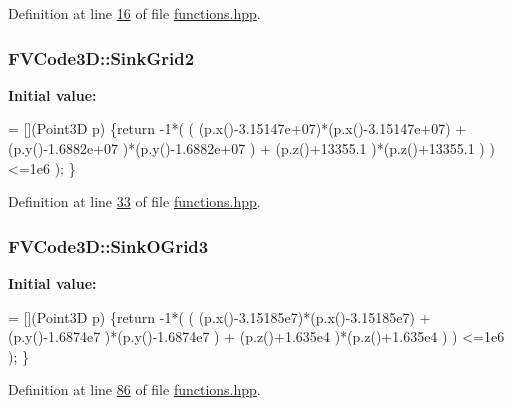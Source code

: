 Definition at line \hyperlink{functions_8hpp_source_l00016}{16} of file \hyperlink{functions_8hpp_source}{functions.\+hpp}.

\subsubsection[{\texorpdfstring{Sink\+Grid2}{SinkGrid2}}]{ F\+V\+Code3\+D\+::\+Sink\+Grid2}\hypertarget{namespaceFVCode3D_a312f262aefa197b219228571b49620be}{}\label{namespaceFVCode3D_a312f262aefa197b219228571b49620be}
{\bfseries Initial value\+:}
\begin{DoxyCode}
= [](Point3D p)
    \{\textcolor{keywordflow}{return} -1*( (
                     (p.x()-3.15147e+07)*(p.x()-3.15147e+07) +
                     (p.y()-1.6882e+07 )*(p.y()-1.6882e+07 ) +
                     (p.z()+13355.1    )*(p.z()+13355.1    )
                   ) <=1e6
                 );
    \}
\end{DoxyCode}


Definition at line \hyperlink{functions_8hpp_source_l00033}{33} of file \hyperlink{functions_8hpp_source}{functions.\+hpp}.

\subsubsection[{\texorpdfstring{Sink\+O\+Grid3}{SinkOGrid3}}]{ F\+V\+Code3\+D\+::\+Sink\+O\+Grid3}\hypertarget{namespaceFVCode3D_a1d325cbbfbdf5832333e0a07e6095053}{}\label{namespaceFVCode3D_a1d325cbbfbdf5832333e0a07e6095053}
{\bfseries Initial value\+:}
\begin{DoxyCode}
= [](Point3D p)
    \{\textcolor{keywordflow}{return} -1*( (
                     (p.x()-3.15185e7)*(p.x()-3.15185e7) +
                     (p.y()-1.6874e7 )*(p.y()-1.6874e7 ) +
                     (p.z()+1.635e4  )*(p.z()+1.635e4  )
                  ) <=1e6
                );
    \}
\end{DoxyCode}


Definition at line \hyperlink{functions_8hpp_source_l00086}{86} of file \hyperlink{functions_8hpp_source}{functions.\+hpp}.

